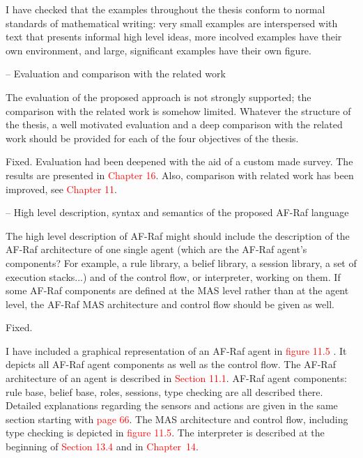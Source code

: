 \documentclass{article}
\newcommand*\R[1]{\textcolor{red}{#1}} %
\newenvironment{them}{\noindent\begingroup\color{blue}}{\endgroup\par}
\begin{document}
I have checked that the examples throughout the thesis conform to normal
standards of mathematical writing: very small examples are interspersed with
text that presents informal high level ideas, more incolved examples have their
own environment, and large, significant examples have their own figure.

\begin{them}

-- Evaluation and comparison with the related work

The evaluation of the proposed approach is not strongly supported; the
comparison with the related work is somehow limited. Whatever the structure of
the thesis, a well motivated evaluation and a deep comparison with the related
work should be provided for each of the four objectives of the thesis.

\end{them}
Fixed. Evaluation had been deepened with the aid of a custom made survey. The
results are presented in \R{Chapter 16}. Also, comparison with related work has been improved, see \R{Chapter 11}.

\begin{them}

-- High level description, syntax and semantics of the proposed AF-Raf language

The high level description of AF-Raf might should include the description of
the AF-Raf architecture of one single agent (which are the AF-Raf agent's
components? For example, a rule library, a belief library, a session library, a
set of execution stacks...) and of the control flow, or interpreter, working on
them. If some AF-Raf components are defined at the MAS level rather than at the
agent level, the AF-Raf MAS architecture and control flow should be given as
well.

\end{them}
Fixed.

I have included a graphical representation of an AF-Raf agent in \R{figure 11.5
}. It depicts all AF-Raf agent components as well as the control flow. The
AF-Raf architecture of an agent is described in \R{Section 11.1}. AF-Raf agent
components: rule base, belief base, roles, sessions, type checking are all
described there. Detailed explanations regarding the sensors and actions are
given in the same section starting with \R{page 66}. The MAS architecture and
control flow, including type checking is depicted in \R{figure 11.5}. The
interpreter is described at the beginning of \R{Section 13.4} and in
\R{Chapter~14}.
\end{document}
